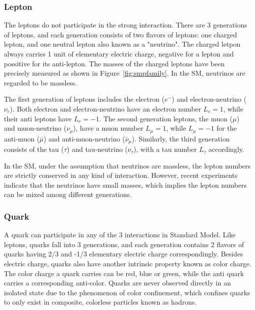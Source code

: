 \subsubsection{Lepton}
The leptons do not participate in the strong interaction. There are 3 generations of leptons, and each generation consists of two flavors of leptons: one charged lepton, and one neutral lepton also known as a "neutrino". The charged letpon always carries 1 unit of elementary electric charge, negative for a lepton and possitive for its anti-lepton. The masses of the charged leptons have been precisely measured as shown in Figure~\ref{fig:smpfamily}. In the SM, neutrinos are regarded to be massless.

\vspace{0.3cm}
The first generation of leptons includes the electron ($e^{-}$) and electron-neutrino ($\nu _{e}$). Both electron and electron-neutrino have an electron number $L_{e}=1$, while their anti leptons have $L_{e}=-1$. The second generation leptons, the muon ($\mu$) and muon-neutrino ($\nu_{\mu}$), have a muon number $L_{\mu}=1$, while $L_{\mu }=-1$ for the anti-muon ($\bar{\mu}$) and anti-muon-neutrino ($\bar{\nu} _{\mu }$). Similarly, the third generation consists of the tau ($\tau$) and tau-neutrino ($\nu _{\tau }$), with a tau number $L_{\tau}$ accordingly.

\vspace{0.3cm}
In the SM, under the assumption that neutrinos are massless, the lepton numbers are strictly conserved in any kind of interaction. However, recent experiments~\cite{neutrinoOscillation1,neutrinoOscillation2} indicate that the neutrinos have small masses, which implies the lepton numbers can be mixed among different generations.
\subsubsection{Quark}
A quark can participate in any of the 3 interactions in Standard Model. Like leptons, quarks fall into 3 generations, and each generation contains 2 flavors of quarks having 2/3 and -1/3 elementary electric charge correspondingly. Besides electric charge, quarks also have another intrinsic property known as color charge. The color charge a quark carries can be red, blue or green, while the anti quark carries a corresponding anti-color. Quarks are never observed directly in an isolated state due to the phenomenon of color confinement, which confines quarks to only exist in composite, colorless particles known as hadrons.

